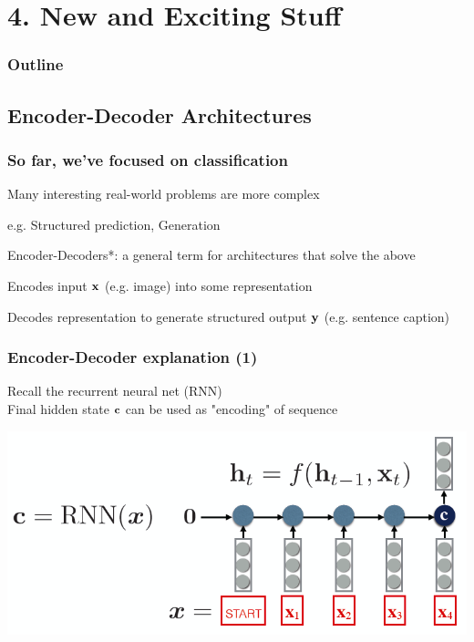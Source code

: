 \section[New Stuff]{4. New and Exciting Stuff}
\begin{frame}
\small{\frametitle{Outline}
\tableofcontents
}
\end{frame}


\subsection[Encoder-Decoder]{Encoder-Decoder Architectures}

\begin{frame}
\frametitle{So far, we've focused on classification}
\bi
\item Many interesting real-world problems are more complex
\item e.g. Structured prediction, Generation
\item Encoder-Decoders*: a general term for architectures that solve the above 
	\bi
	\item Encodes input $\bf{x}$ (e.g. image) into some representation
	\item Decodes representation to generate structured output $\bf{y}$ (e.g. sentence caption)
	\ei
\ei
{}
\end{frame}

\begin{frame}
\frametitle{Encoder-Decoder explanation (1)}
Recall the recurrent neural net (RNN)\\[0.2cm]
Final hidden state $\bf{c}$ can be used as "encoding" of sequence
\centerline{\includegraphics[scale=0.4]{figs/explain_encdec1}}
\end{frame}

